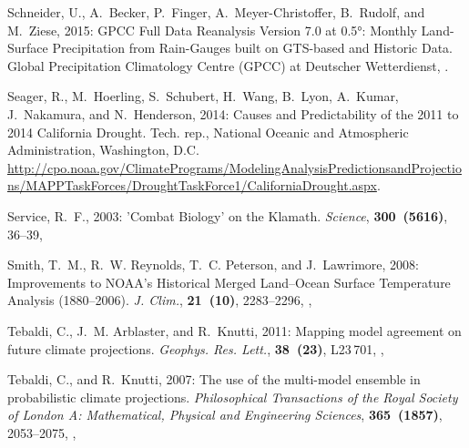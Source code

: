 \documentclass[final, double]{ua-thesis}
\begin{document}
\begin{thebibliography}{}
Schneider, U., A.~Becker, P.~Finger, A.~Meyer-Christoffer, B.~Rudolf, and
  M.~Ziese, 2015: {GPCC} {Full} {Data} {Reanalysis} {Version} 7.0 at 0.5°:
  {Monthly} {Land}-{Surface} {Precipitation} from {Rain}-{Gauges} built on
  {GTS}-based and {Historic} {Data}. Global Precipitation Climatology Centre
  (GPCC) at Deutscher Wetterdienst,
  .

Seager, R., M.~Hoerling, S.~Schubert, H.~Wang, B.~Lyon, A.~Kumar, J.~Nakamura,
  and N.~Henderson, 2014: Causes and {Predictability} of the 2011 to 2014
  {California} {Drought}. Tech. rep., National Oceanic and Atmospheric
  Administration, Washington, D.C.
  \urlprefix\url{http://cpo.noaa.gov/ClimatePrograms/ModelingAnalysisPredictionsandProjections/MAPPTaskForces/DroughtTaskForce1/CaliforniaDrought.aspx}.

Service, R.~F., 2003: '{Combat} {Biology}' on the {Klamath}. \textit{Science},
  \textbf{300~(5616)}, 36--39,

Smith, T.~M., R.~W. Reynolds, T.~C. Peterson, and J.~Lawrimore, 2008:
  Improvements to {NOAA}’s {Historical} {Merged} {Land}–{Ocean} {Surface}
  {Temperature} {Analysis} (1880–2006). \textit{J. Clim.}, \textbf{21~(10)},
  2283--2296, ,

Tebaldi, C., J.~M. Arblaster, and R.~Knutti, 2011: Mapping model agreement on
  future climate projections. \textit{Geophys. Res. Lett.}, \textbf{38~(23)},
  L23\,701, ,

Tebaldi, C., and R.~Knutti, 2007: The use of the multi-model ensemble in
  probabilistic climate projections. \textit{Philosophical Transactions of the
  Royal Society of London A: Mathematical, Physical and Engineering Sciences},
  \textbf{365~(1857)}, 2053--2075, ,




\end{thebibliography}
\end{document}
